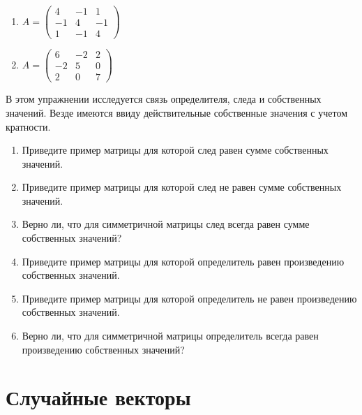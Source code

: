 \documentclass[pdftex,11pt,openany]{book}\usepackage[]{graphicx}\usepackage[]{color}
\begin{document}
\begin{problem}
\begin{enumerate}
\item $A=\begin{pmatrix}
4 & -1 & 1 \\
-1 & 4 & -1 \\
1 & -1 & 4
\end{pmatrix}$ 

\item $A=\begin{pmatrix}
6 & -2 & 2 \\
-2 & 5 & 0 \\
2 & 0 & 7
\end{pmatrix}$ 
\end{enumerate}
\end{problem}

\begin{solution}
\end{solution}


\begin{problem}
В этом упражнении исследуется связь определителя, следа и собственных значений. Везде имеются ввиду действительные собственные значения с учетом кратности.
\begin{enumerate}
\item Приведите пример матрицы для которой след равен сумме собственных значений.  
\item Приведите пример матрицы для которой след не равен сумме собственных значений. 
\item Верно ли, что для симметричной матрицы след всегда равен сумме собственных значений? 
\item Приведите пример матрицы для которой определитель равен произведению собственных значений.  
\item Приведите пример матрицы для которой определитель не равен произведению собственных значений. 
\item Верно ли, что для симметричной матрицы определитель всегда равен произведению собственных значений? 
\end{enumerate}
\end{problem}

\begin{solution}
\end{solution}

\chapter{Случайные векторы}
\end{document}
